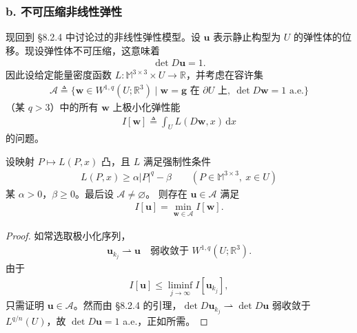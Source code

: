 \documentclass[../../main.tex]{subfiles}
\begin{document}
\subsubsection*{b. 不可压缩非线性弹性}

现回到 \S8.2.4 中讨论过的非线性弹性模型。设 $\mathbf{u}$ 表示静止构型为 $U$ 的弹性体的位移。现设弹性体不可压缩，这意味着
\begin{align*}
\det D\mathbf{u}=1.
\end{align*}
因此设给定能量密度函数 $L:\mathbb{M}^{3\times 3}\times U\to\mathbb{R}$，并考虑在容许集
\begin{align*}
\mathcal{A}\triangleq\{\mathbf{w}\in W^{1,q}(U;\mathbb{R}^3)\mid \mathbf{w}=\mathbf{g}\text{ 在 }\partial U\text{ 上},\ \det D\mathbf{w}=1\text{ a.e.}\}
\end{align*}
（某 $q>3$）中的所有 $\mathbf{w}$ 上极小化弹性能
\begin{align*}
I[\mathbf{w}]\triangleq\int_U L(D\mathbf{w},x)\,\mathrm{d}x
\end{align*}
的问题。

\begin{theorem}[带行列式约束的极小元]\label{theorem:ch08-4-7-不可压缩极小元}
设映射 $P\mapsto L(P,x)$ 凸，且 $L$ 满足强制性条件
\begin{align*}
L(P,x)\geqslant\alpha|P|^q-\beta\qquad (P\in\mathbb{M}^{3\times 3},\ x\in U)
\end{align*}
某 $\alpha>0$，$\beta\geqslant 0$。最后设 $\mathcal{A}\neq\varnothing $。
则存在 $\mathbf{u}\in\mathcal{A}$ 满足
\begin{align*}
I[\mathbf{u}]=\min_{\mathbf{w}\in\mathcal{A}}I[\mathbf{w}].
\end{align*}
\begin{proof}
如常选取极小化序列，
\begin{align*}
\mathbf{u}_{k_j}\rightharpoonup\mathbf{u}\quad\text{弱收敛于 }W^{1,q}(U;\mathbb{R}^3).
\end{align*}
由于
\begin{align*}
I[\mathbf{u}]\leqslant\liminf_{j\to\infty}I[\mathbf{u}_{k_j}],
\end{align*}
只需证明 $\mathbf{u}\in\mathcal{A}$。然而由 \S8.2.4 的引理，$\det D\mathbf{u}_{k_j}\rightharpoonup\det D\mathbf{u}$ 弱收敛于 $L^{q/n}(U)$，故 $\det D\mathbf{u}=1$ a.e.，正如所需。
\end{proof}
\end{theorem}
\end{document}
